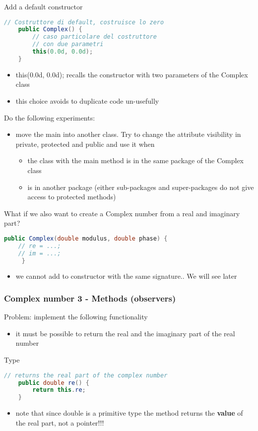 \documentclass{article}
\begin{document}
Add a default constructor
\begin{lstlisting}[language=Java,escapechar=|]
// Costruttore di default, costruisce lo zero
	public Complex() {
		// caso particolare del costruttore
		// con due parametri
		this(0.0d, 0.0d);
	}
\end{lstlisting}
\begin{itemize}
\item this(0.0d, 0.0d); recalls the constructor with two parameters of the Complex class
\item this choice avoids to duplicate code un-usefully
\end{itemize}

Do the following experiments:
\begin{itemize}
\item move the main into another class. Try to change the attribute visibility in private, protected and public and use it when
\begin{itemize}
\item the class with the main method is in the same package of the Complex class
\item is in another package (either sub-packages and super-packages do not give access to protected methods)
\end{itemize}
\end{itemize}

What if we also want to create a Complex number from a real and imaginary part? 
\begin{lstlisting}[language=Java,escapechar=|]
	public Complex(double modulus, double phase) {
	// re = ...;
	// im = ...;
     }
\end{lstlisting}
\begin{itemize}
\item we cannot add to constructor with the same signature.. We will see later 
\end{itemize}


\subsubsection{Complex number 3 - Methods (observers)}
Problem: implement the following functionality
\begin{itemize}
\item it must be possible to return the real and the imaginary part of the real number
\end{itemize}
Type
\begin{lstlisting}[language=Java,escapechar=|]
	// returns the real part of the complex number
	public double re() {
		return this.re;
	}
\end{lstlisting}
\begin{itemize}
\item note that since double is a primitive type the method returns the \textbf{value} of the real part, not a pointer!!!
\end{itemize}
\end{document}
